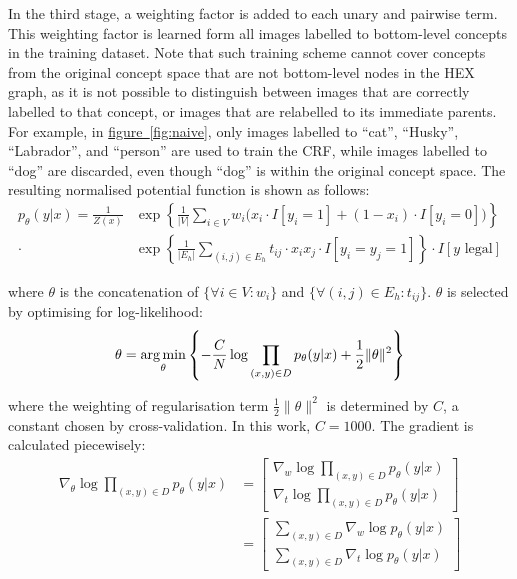\documentclass[11pt,a4paper]{book}
\newcommand{\argmin}{\operatornamewithlimits{arg\,min}}
\begin{document}
In the third stage, a weighting factor is added to each unary and pairwise term. This weighting factor is learned form all images labelled to bottom-level concepts in the training dataset. Note that such training scheme cannot cover concepts from the original concept space that are not bottom-level nodes in the HEX graph, as it is not possible to distinguish between images that are correctly labelled to that concept, or images that are relabelled to its immediate parents. For example, in \hyperref[fig:naive]{figure~\ref{fig:naive}}, only images labelled to ``cat'', ``Husky'', ``Labrador'', and ``person'' are used to train the CRF, while images labelled to ``dog'' are discarded, even though ``dog'' is within the original concept space. The resulting normalised potential function is shown as follows:
\begin{align}
p_\theta(y|x)=\frac{1}{Z(x)}&\exp\left\{\frac{1}{|V|}\sum_{i\in V}w_i\big(x_i\cdot I[y_i=1]+(1-x_i)\cdot I[y_i=0]\big)\right\}\nonumber\\
\cdot&\exp\left\{\frac{1}{|E_h|}\sum_{(i,j)\in E_h}t_{ij}\cdot x_ix_j\cdot I[y_i=y_j=1]\right\}\cdot I[y\text{ legal}]
\end{align}

where $\theta$ is the concatenation of $\{\forall i\in V:w_i\}$ and $\{\forall(i,j)\in E_h:t_{ij}\}$. $\theta$ is selected by optimising for log-likelihood:
\begin{equation}
\theta=\argmin_\theta\left\{-\frac{C}{N}\log\prod_{(x,y)\in D}p_\theta(y|x)+\frac{1}{2}\|\theta\|^2\right\}
\end{equation}

where the weighting of regularisation term $\frac{1}{2}\|\theta\|^2$ is determined by $C$, a constant chosen by cross-validation. In this work, $C=1000$. The gradient is calculated piecewisely:
\begin{align}
\nabla_\theta\log\prod_{(x,y)\in D}p_\theta(y|x)&=\begin{bmatrix}
\nabla_w\log\prod_{(x,y)\in D}p_\theta(y|x)\\ 
\nabla_t\log\prod_{(x,y)\in D}p_\theta(y|x)
\end{bmatrix}\nonumber\\
&=\begin{bmatrix}
\sum_{(x,y)\in D}\nabla_w\log p_\theta(y|x)\\ 
\sum_{(x,y)\in D}\nabla_t\log p_\theta(y|x)
\end{bmatrix}
\label{eqn:nablatheta}
\end{align}
\end{document}
